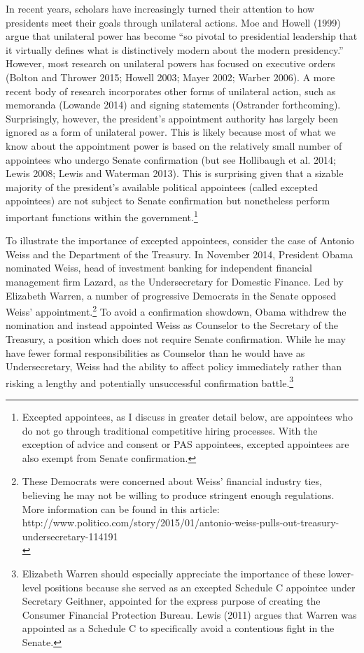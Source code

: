 \documentclass[12pt]{article}
\begin{document}
In recent years, scholars have increasingly turned their attention to how presidents meet their goals through unilateral actions. Moe and Howell (1999) argue that unilateral power has become ``so pivotal to presidential leadership that it virtually defines what is distinctively modern about the modern presidency.'' However, most research on unilateral powers has focused on executive orders (Bolton and Thrower 2015; Howell 2003; Mayer 2002; Warber 2006). A more recent body of research incorporates other forms of unilateral action, such as memoranda (Lowande 2014) and signing statements (Ostrander forthcoming). Surprisingly, however, the president's appointment authority has largely been ignored as a form of unilateral power. This is likely because most of what we know about the appointment power is based on the relatively small number of appointees who undergo Senate confirmation (but see Hollibaugh et al. 2014; Lewis 2008; Lewis and Waterman 2013). This is surprising given that a sizable majority of the president's available political appointees (called excepted appointees) are not subject to Senate confirmation but nonetheless perform important functions within the government.\footnote{Excepted appointees, as I discuss in greater detail below, are appointees who do not go through traditional competitive hiring processes. With the exception of advice and consent or PAS appointees, excepted appointees are also exempt from Senate confirmation.}
	
	To illustrate the importance of excepted appointees, consider the case of Antonio Weiss and the Department of the Treasury. In November 2014, President Obama nominated Weiss, head of investment banking for independent financial management firm Lazard, as the Undersecretary for Domestic Finance. Led by Elizabeth Warren, a number of progressive Democrats in the Senate opposed Weiss' appointment.\footnote{ These Democrats were concerned about Weiss' financial industry ties, believing he may not be willing to produce stringent enough regulations. More information can be found in this article: http://www.politico.com/story/2015/01/antonio-weiss-pulls-out-treasury-undersecretary-114191\\} To avoid a confirmation showdown, Obama withdrew the nomination and instead appointed Weiss as Counselor to the Secretary of the Treasury, a position which does not require Senate confirmation. While he may have fewer formal responsibilities as Counselor than he would have as Undersecretary, Weiss had the ability to affect policy immediately rather than risking a lengthy and potentially unsuccessful confirmation battle.\footnote{Elizabeth Warren should especially appreciate the importance of these lower-level positions because she served as an excepted Schedule C appointee under Secretary Geithner, appointed for the express purpose of creating the Consumer Financial Protection Bureau. Lewis (2011) argues that Warren was appointed as a Schedule C to specifically avoid a contentious fight in the Senate.}
	
\end{document}
